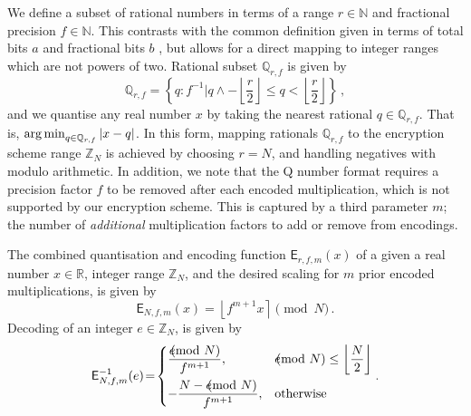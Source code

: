 \documentclass[twocolumn]{autart}
\begin{document}
We define a subset of rational numbers in terms of a range $r \in \mathbb{N}$ and fractional precision $f \in \mathbb{N}$. This contrasts with the common definition given in terms of total bits $a$ and fractional bits $b$ \cite{oberstarFixedPointRepresentationFractional2007,schulzedarupEncryptedCooperativeControl2019,farokhiSecurePrivateControl2017}, but allows for a direct mapping to integer ranges which are not powers of two. Rational subset $\mathbb{Q}_{r,f}$ is given by
\begin{equation*}
    \mathbb{Q}_{r,f} = \left\{q : f^{-1} | q \wedge -\left\lfloor\frac{r}{2}\right\rfloor \leq q < \left\lfloor\frac{r}{2}\right\rfloor \right\}\,,
\end{equation*}
and we quantise any real number $x$ by taking the nearest rational $q \in \mathbb{Q}_{r,f}$. That is, $\operatorname*{arg\,min}_{q\in\mathbb{Q}_{r,f}} |x-q|$. In this form, mapping rationals $\mathbb{Q}_{r,f}$ to the encryption scheme range $\mathbb{Z}_N$ is achieved by choosing $r=N$, and handling negatives with modulo arithmetic. In addition, we note that the Q number format requires a precision factor $f$ to be removed after each encoded multiplication, which is not supported by our encryption scheme. This is captured by a third parameter $m$; the number of \textit{additional} multiplication factors to add or remove from encodings.

The combined quantisation and encoding function $\mathsf{E}_{r,f,m}(x)$ of a given a real number $x \in \mathbb{R}$, integer range $\mathbb{Z}_N$, and the desired scaling for $m$ prior encoded multiplications, is given by
\begin{equation}
    \mathsf{E}_{N,f,m}(x) = \left\lfloor f^{m+1} x \right\rceil \pmod{N}\,. \label{eqn:encode}
\end{equation}
Decoding of an integer $e \in \mathbb{Z}_N$, is given by
\begin{equation}
    \mathsf{E}^{-1}_{N,f,m}(e) \!=\! 
    \begin{dcases}
        \frac{e\hspace{-8pt}\pmod{N}}{f^{m+1}}, &e\hspace{-8pt}\pmod{N} \leq \left\lfloor\frac{N}{2}\right\rfloor \\
        -\frac{N - e\hspace{-8pt}\pmod{N}}{f^{m+1}}, &\text{otherwise} \\
    \end{dcases}.
\end{equation}
\end{document}
